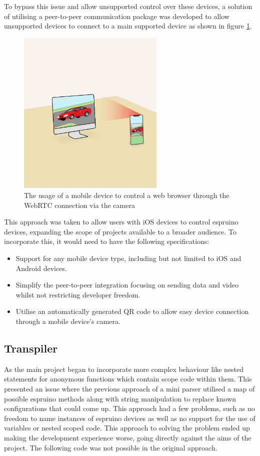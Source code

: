 \documentclass{l4proj}
\begin{document}
To bypass this issue and allow unsupported control over these devices, a solution of utilising a peer-to-peer communication package was developed to allow unsupported devices to connect to a main supported device as shown in figure \ref{fig:mobile-computer-connection}. 

\begin{figure}[!ht]
    \centering
    \includegraphics[width=7cm]{dissertation/images/mobile-computer-connection.png}
    \caption{The usage of a mobile device to control a web browser through the WebRTC connection via the camera}
    \label{fig:mobile-computer-connection}
\end{figure}

This approach was taken to allow users with iOS devices to control espruino devices, expanding the scope of projects available to a broader audience. To incorporate this, it would need to have the following specifications:
\\
\begin{itemize}
    \item Support for any mobile device type, including but not limited to iOS and Android devices.
    \item Simplify the peer-to-peer integration focusing on sending data and video whilst not restricting developer freedom.
    \item Utilise an automatically generated QR code to allow easy device connection through a mobile device's camera.
\end{itemize}


\subsection{Transpiler}
As the main project began to incorporate more complex behaviour like nested statements for anonymous functions which contain scope code within them. This presented an issue where the previous approach of a mini parser utilised a map of possible espruino methods along with string manipulation to replace known configurations that could come up. This approach had a few problems, such as no freedom to name instances of espruino devices as well as no support for the use of variables or nested scoped code. This approach to solving the problem ended up making the development experience worse, going directly against the aims of the project. The following code was not possible in the original approach.
\end{document}
